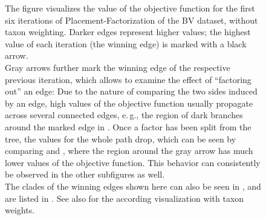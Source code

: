 \begin{figure}[!htb]
{        The figure visualizes the value of the objective function for the first six iterations of
        Placement-Factorization of the \ac{BV} dataset, without taxon weighting.
        Darker edges represent higher values;
        the highest value of each iteration (the winning edge) is marked with a black arrow.
        \\
        Gray arrows further mark the winning edge of the respective previous iteration,
        which allows to examine the effect of ``factoring out'' an edge:
        Due to the nature of comparing the two sides induced by an edge,
        high values of the objective function usually propagate across several connected edges,
        e.\,g., the region of dark branches around the marked edge in .
        Once a factor has been split from the tree, the values for the whole path drop,
        which can be seen by comparing 
        and ,
        where the region around the gray arrow has much lower values of the objective function.
        This behavior can consistently be observed in the other subfigures as well.
        \\
        The clades of the winning edges shown here can also be seen in ,
        and are listed in .
        See also  for the according visualization with taxon weights.
    }
    \label{supp:fig:pf_bv_place_no_tw_ovs}
\end{figure}


